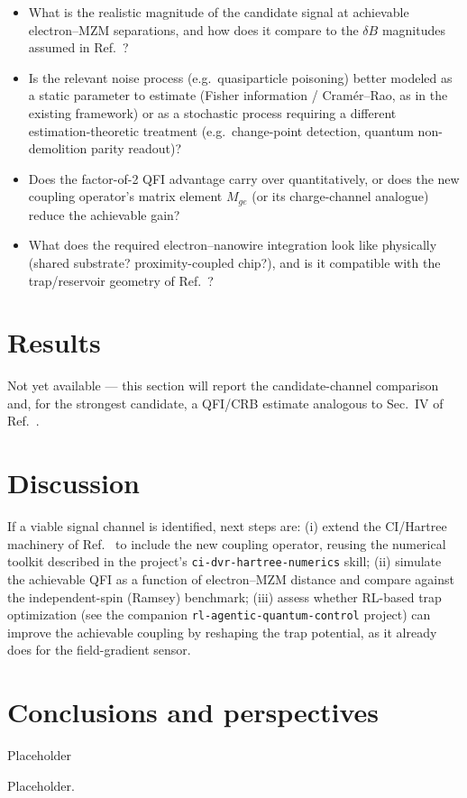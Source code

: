 \documentclass[aps,pra,reprint,superscriptaddress,longbibliography]{revtex4-2}
\begin{document}
\begin{itemize}
  \item What is the realistic magnitude of the candidate signal at achievable electron--MZM
  separations, and how does it compare to the $\delta B$ magnitudes assumed in
  Ref.~\cite{perruzza2026}?
  \item Is the relevant noise process (e.g.\ quasiparticle poisoning) better modeled as a static
  parameter to estimate (Fisher information / Cram\'er--Rao, as in the existing framework) or as a
  stochastic process requiring a different estimation-theoretic treatment (e.g.\ change-point
  detection, quantum non-demolition parity readout)?
  \item Does the factor-of-2 QFI advantage carry over quantitatively, or does the new coupling
  operator's matrix element $M_{ge}$ (or its charge-channel analogue) reduce the achievable gain?
  \item What does the required electron--nanowire integration look like physically (shared substrate?
  proximity-coupled chip?), and is it compatible with the trap/reservoir geometry of
  Ref.~\cite{castoria2025}?
\end{itemize}

\section{Results}

Not yet available — this section will report the candidate-channel comparison and, for the
strongest candidate, a QFI/CRB estimate analogous to Sec.~IV of Ref.~\cite{perruzza2026}.

\section{Discussion}

If a viable signal channel is identified, next steps are: (i) extend the CI/Hartree machinery of
Ref.~\cite{beysengulov2024} to include the new coupling operator, reusing the numerical toolkit
described in the project's \texttt{ci-dvr-hartree-numerics} skill; (ii) simulate the achievable QFI
as a function of electron--MZM distance and compare against the independent-spin (Ramsey) benchmark;
(iii) assess whether RL-based trap optimization (see the companion \texttt{rl-agentic-quantum-control}
project) can improve the achievable coupling by reshaping the trap potential, as it already does for
the field-gradient sensor.
\section{Conclusions and perspectives}
Placeholder
\begin{acknowledgments}
Placeholder.
\end{acknowledgments}


\end{document}
